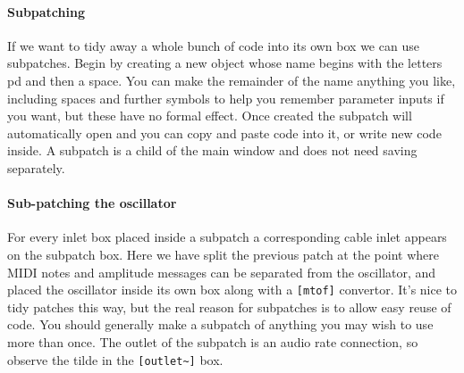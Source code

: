 \paragraph{Subpatching}
If we want to tidy away a whole bunch of code into its own box we can
use subpatches. Begin by creating a new object whose name begins with the
letters pd and then a space. You can make the remainder of the name anything
you like, including spaces and further symbols to help you remember parameter
inputs if you want, but these have no formal effect.
Once created the subpatch will automatically open and
you can copy and paste code into it, or write new code inside. A subpatch
is a child of the main window and does not need saving separately.


\paragraph{Sub-patching the oscillator}
For every inlet box placed inside a subpatch a corresponding cable inlet  
appears on the subpatch box. Here we have split the previous patch at
the point where MIDI notes and amplitude messages can be separated from
the oscillator, and placed the oscillator inside its own box along with
a \verb+[mtof]+ convertor. It's nice to tidy patches this way, but the real
reason for subpatches is to allow easy reuse of code. You should generally
make a subpatch of anything you may wish to use more than once. The outlet
of the subpatch is an audio rate connection, so observe the tilde in the
\verb+[outlet~]+ box.

